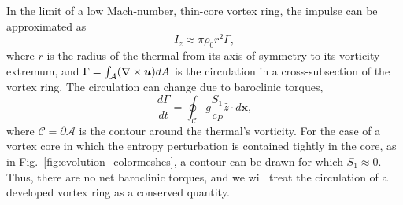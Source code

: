 In the limit of a low Mach-number, thin-core vortex ring, the impulse can be approximated as
\begin{equation}
I_z \approx \pi \rho_0 r^2 \Gamma,
\label{eqn:alb19_impulse_approx}
\end{equation}
where $r$ is the radius of the thermal from its axis of symmetry to its vorticity extremum, and $\Gamma = \int_{\mathcal{A}} (\nabla\times\bm{u})dA$ is the circulation in a cross-subsection of the vortex ring.
The circulation can change due to baroclinic torques,
\begin{equation}
\frac{d\Gamma}{dt} = \oint_{\mathcal{C}} g \frac{S_1}{c_P}\hat{z} \cdot d\bm{x},
\label{eqn:alb19_circulation}
\end{equation}
where $\mathcal{C}=\partial \mathcal{A}$ is the contour around the thermal's vorticity.
For the case of a vortex core in which the entropy perturbation is contained tightly in the core, as in Fig.~\ref{fig:evolution_colormeshes}, a contour can be drawn for which $S_1\approx0$.
Thus, there are no net baroclinic torques, and we will treat the circulation of a developed vortex ring as a conserved quantity.


